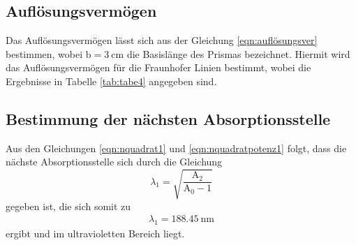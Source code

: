 \subsection{Auflösungsvermögen}
Das Auflösungsvermögen lässt sich aus der Gleichung \ref{eqn:auflösungsver}
bestimmen, wobei $\text{b}=\SI{3}{\centi\meter}$ die Basislänge des Prismas
bezeichnet.
Hiermit wird das Auflösungsvermögen für die Fraunhofer Linien bestimmt, wobei die
Ergebnisse in Tabelle \ref{tab:tabe4} angegeben sind.


\subsection{Bestimmung der nächsten Absorptionsstelle}
Aus den Gleichungen \ref{eqn:nquadrat1} und \ref{eqn:nquadratpotenz1} folgt, dass die nächste Absorptionsstelle sich durch die
Gleichung
\begin{equation}
  \lambda_1 = \sqrt{\frac{\text{A}_2}{\text{A}_0-1}}
\end{equation}
gegeben ist, die sich somit zu
\begin{align*}
    \lambda_1 = \SI{188.45}{\nano\meter}
\end{align*}
ergibt und im ultravioletten Bereich liegt.
